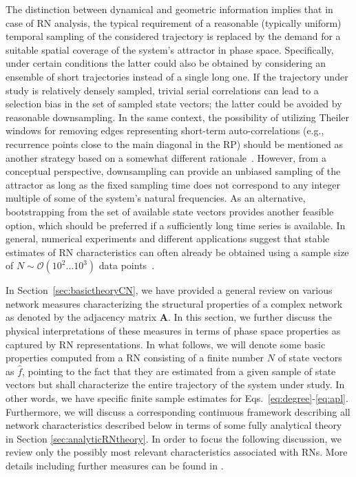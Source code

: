 		The distinction between dynamical and geometric information implies that in case of RN analysis, the typical requirement of a reasonable (typically uniform) temporal sampling of the considered trajectory is replaced by the demand for a suitable spatial coverage of the system's attractor in phase space. Specifically, under certain conditions the latter could also be obtained by considering an ensemble of short trajectories instead of a single long one. If the trajectory under study is relatively densely sampled, trivial serial correlations can lead to a selection bias in the set of sampled state vectors; the latter could be avoided by reasonable downsampling. In the same context, the possibility of utilizing Theiler windows for removing edges representing short-term auto-correlations (e.g., recurrence points close to the main diagonal in the RP) should be mentioned as another strategy based on a somewhat different rationale~\cite{Donner2010a}. However, from a conceptual perspective, downsampling can provide an unbiased sampling of the attractor as long as the fixed sampling time does not correspond to any integer multiple of some of the system's natural frequencies. As an alternative, bootstrapping from the set of available state vectors provides another feasible option, which should be preferred if a sufficiently long time series is available. In general, numerical experiments and different applications suggest that stable estimates of RN characteristics can often already be obtained using a sample size of $N\sim\mathcal{O}(10^2\dots 10^3)$ data points~\cite{Donges2011,Donges2011a}.

		In Section~\ref{sec:basictheoryCN}, we have provided a general review on various network measures characterizing the structural properties of a complex network as denoted by the adjacency matrix $\mathbf{A}$. In this section, we further discuss the physical interpretations of these measures in terms of phase space properties as captured by RN representations. In what follows, we will denote some basic properties computed from a RN consisting of a finite number $N$ of state vectors as $\hat{f}$, pointing to the fact that they are estimated from a given sample of state vectors but shall characterize the entire trajectory of the system under study. In other words, we have specific finite sample estimates for Eqs.~\eqref{eq:degree}-\eqref{eq:apl}. Furthermore, we will discuss a corresponding continuous framework describing all network characteristics described below in terms of some fully analytical theory in Section \ref{sec:analyticRNtheory}. In order to focus the following discussion, we review only the possibly most relevant characteristics associated with RNs. More details including further measures can be found in \cite{Donges2012,Donner2010a}.


